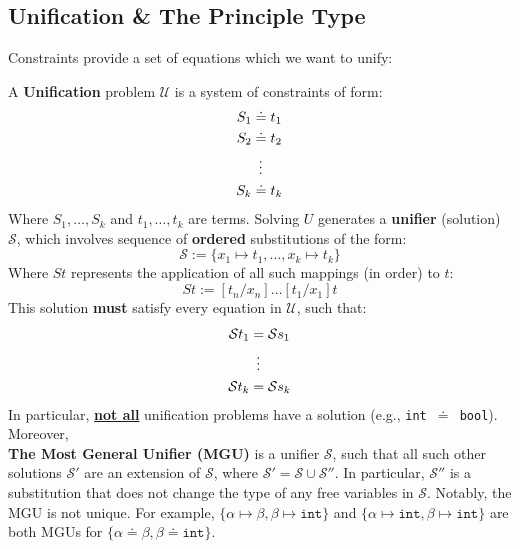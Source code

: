 \subsection{Unification \& The Principle Type}

\noindent
Constraints provide a set of equations which we want to unify:
\begin{Def}

    A \textbf{Unification} problem $\mathcal{U}$ is a system of constraints of form:
    \begin{align*}
        S_1 &\doteq t_1 \\
        S_2 &\doteq t_2 \\
        &\hspace{.5em}\vdots \\
        S_k &\doteq t_k
    \end{align*}
    \noindent
    Where $S_1, \ldots, S_k$ and $t_1, \ldots, t_k$ are terms. Solving $U$ generates a \textbf{unifier} (solution) $\mathcal{S}$, which involves
    sequence of \textbf{ordered} substitutions of the form:
    \[ \mathcal{S} := \{x_1 \mapsto t_1, \ldots, x_k \mapsto t_k\} \]
    \noindent
    Where $St$ represents the application of all such mappings (in order) to $t$:
    \[St:= [t_n/x_n] \ldots [t_1/x_1]t\]
    This solution \textbf{must} satisfy every equation in $\mathcal{U}$, such that:
    \begin{align*}
        \mathcal{S}t_1 &= \mathcal{S}s_1 \\
        &\hspace{.5em}\vdots \\
        \mathcal{S}t_k &= \mathcal{S}s_k
    \end{align*}
    \noindent
    In particular, \underline{\textbf{not all}} unification problems have a solution (e.g., \texttt{int }$\doteq$\texttt{ bool}). Moreover,\\
    \textbf{The Most General Unifier (MGU)} is a unifier $\mathcal{S}$, such that all such other solutions $\mathcal{S}'$ are an extension of $\mathcal{S}$, where
    $\mathcal{S}' = \mathcal{S} \cup \mathcal{S}''$.
    In particular, $\mathcal{S}''$ is a substitution that does not change the type of any free variables in $\mathcal{S}$. Notably, the MGU is not unique. For example, $\{\alpha \mapsto \beta, \beta \mapsto \texttt{int}\}$ and $\{\alpha \mapsto \texttt{int}, \beta \mapsto \texttt{int}\}$ 
    are both MGUs for $\{\alpha \doteq \beta, \beta\doteq\texttt{int}\}$.\\
    

\end{Def}

